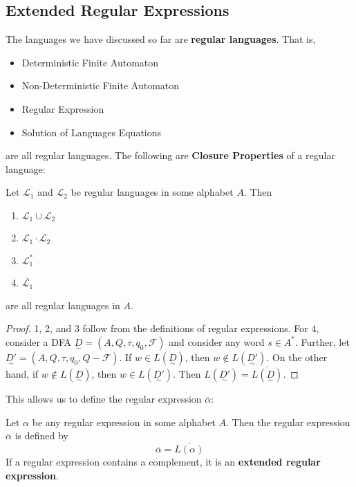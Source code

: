 \subsection{Extended Regular Expressions}\label{subsubsec:extended-regular-expressions"}
The languages we have discussed so far are \textbf{regular languages}. That is, 

\begin{itemize}
      \item Deterministic Finite Automaton
      \item Non-Deterministic Finite Automaton
      \item Regular Expression
      \item Solution of Languages Equations
\end{itemize}

are all regular languages. The following are \textbf{Closure Properties} of a regular language:

\begin{theorem}
      Let \(\mathcal{L_1}\) and \(\mathcal{L_2}\) be regular languages in some alphabet \(A\). Then
      \begin{enumerate}[1.]
            \item \(\mathcal{L}_1\cup\mathcal{L}_2\)
            \item \(\mathcal{L}_1\cdot \mathcal{L}_2\)
            \item \(\mathcal{L}_1^*\)
            \item \(\overline{\mathcal{L}_1}\)
      \end{enumerate}

      are all regular languages in \(A\).
\end{theorem}

\begin{proof}
      1, 2, and 3 follow from the definitions of regular expressions. For 4, consider a DFA \(\underset{\sim}{D}=(A, Q, \tau, q_0, \mathcal{F})\) and consider any word \(s\in A^*\). Further, let \(\underset{\sim}{D'}=(A, Q, \tau, q_0, Q-\mathcal{F})\). If \(w\in L(\underset{\sim}{D})\), then \(w\not\in L(\underset{\sim}{D'})\). On the other hand, if \(w\not\in L(\underset{\sim}{D})\), then \(w\in L(\underset{\sim}{D'})\). Then \(L(\underset{\sim}{D'})=\overline{L(\underset{\sim}{D})}\).
\end{proof}

This allows us to define the regular expression \(\overline{\alpha}\):

\begin{definition}
      Let \(\alpha \) be any regular expression in some alphabet \(A\). Then the regular expression \(\overline{\alpha}\) is defined by \[\overline{\alpha}=\overline{L(\alpha)}\] If a regular expression contains a complement, it is an \textbf{extended regular expression}.
\end{definition}

